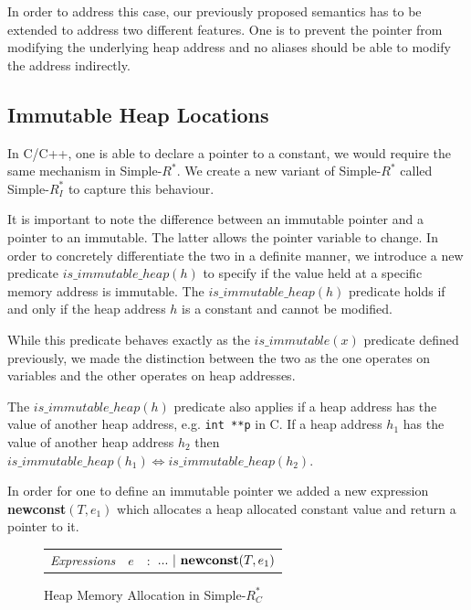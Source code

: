 \documentclass[a4paper,12pt]{report}
\begin{document}
\par
In order to address this case, our previously proposed semantics has to be 
extended to address two different features. One is to prevent the pointer from 
modifying the underlying heap address and no aliases should be able to modify 
the address indirectly.

\subsection{Immutable Heap Locations}
In C/C++, one is able to declare a pointer to a constant, we would require 
the same mechanism in Simple-$R^{*}$. We create a new variant of Simple-$R^{*}$ 
called Simple-$R^{*}_{I}$ to capture this behaviour. 

\par
It is important to note the 
difference between an immutable pointer and a pointer 
to an immutable. The latter allows the pointer variable to change. In order to 
concretely differentiate the two in a definite manner, we introduce 
a new predicate $is\_immutable\_heap(h)$ to specify if the value held at a 
specific memory address is immutable. The $is\_immutable\_heap(h)$ predicate 
holds if and only if the heap address $h$ is a constant and cannot be modified.

\par
While this predicate behaves exactly as the $is\_immutable(x)$ predicate defined 
previously, we made the distinction between the two as the one operates on variables 
and the other operates on heap addresses. 

\par 
The $is\_immutable\_heap(h)$ predicate also applies if a heap address has the value of 
another heap address, e.g. \verb|int **p| in C. If a heap address $h_1$ has the 
value of another heap address $h_2$ then $is\_immutable\_heap(h_1) \Leftrightarrow 
is\_immutable\_heap(h_2)$.  

\par
In order for one to define an immutable pointer we added a new expression 
\textbf{newconst}$(T, e_1)$ which allocates a heap allocated constant value and 
return a pointer to it. 

\begin{figure}[H]
  \begin{center}
    \begin{tabular} {l l l}      
      \textit{Expressions} & $e$& $:$ $...\text{ }|\text{ \textbf{newconst}}(T, e_1)$ \\
    \end{tabular}
  \end{center}
  \caption{Heap Memory Allocation in Simple-$R^{*}_{C}$}
\end{figure}
\end{document}
